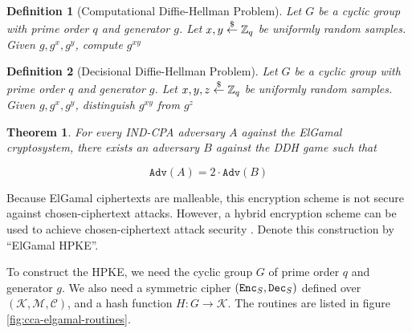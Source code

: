 \documentclass{article}
\newtheorem{definition}{Definition}[section]
\newtheorem{theorem}{Theorem}[section]
\begin{document}
\begin{definition}[Computational Diffie-Hellman Problem]
    Let $G$ be a cyclic group with prime order $q$ and generator $g$. Let $x, y \stackrel{\$}{\leftarrow} \mathbb{Z}_q$ be uniformly random samples. Given $g, g^x,g^y$, compute $g^{xy}$
\end{definition}

\begin{definition}[Decisional Diffie-Hellman Problem]
    Let $G$ be a cyclic group with prime order $q$ and generator $g$. Let $x, y, z \stackrel{\$}{\leftarrow} \mathbb{Z}_q$ be uniformly random samples. Given $g, g^x, g^y$, distinguish $g^{xy}$ from $g^z$
\end{definition}

\begin{theorem}
    For every IND-CPA adversary $A$ against the ElGamal cryptosystem, there exists an adversary $B$ against the DDH game such that

    \begin{equation*}
        \texttt{Adv}(A) = 2 \cdot \texttt{Adv}(B)
    \end{equation*}
\end{theorem}

Because ElGamal ciphertexts are malleable, this encryption scheme is not secure against chosen-ciphertext attacks. However, a hybrid encryption scheme can be used to achieve chosen-ciphertext attack security \cite{boneh2020graduate}. Denote this construction by ``ElGamal HPKE''. 

To construct the HPKE, we need the cyclic group $G$ of prime order $q$ and generator $g$. We also need a symmetric cipher $(\texttt{Enc}_S, \texttt{Dec}_S)$ defined over $(\mathcal{K}, \mathcal{M}, \mathcal{C})$, and a hash function $H: G \rightarrow \mathcal{K}$. The routines are listed in figure \ref{fig:cca-elgamal-routines}.
\end{document}

